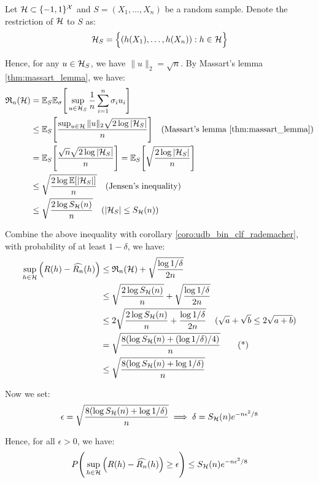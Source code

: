 \begin{proof*}
    Let $\mathcal{H}\subset\{-1,1\}^{\mathcal{X}}$ and $S=(X_1, \dots, X_n)$ be a random sample. Denote the restriction of $\mathcal{H}$ to $S$ as:
    \begin{align*}
        \mathcal{H}_S = \Big\{ 
            (h(X_1), \dots, h(X_n)) : h \in \mathcal{H}
         \Big\}
    \end{align*}

    \noindent Hence, for any $u\in\mathcal{H}_S$, we have $\|u\|_2 = \sqrt{n}$. By Massart's lemma \ref{thm:massart_lemma}, we have:
    \begin{align*}
        \RC_n(\Hf) &= \E_S\E_\sigma\biggSquare{
            \sup_{u\in \Hf_S} \frac{1}{n}\sum_{i=1}^n \sigma_i u_i
        } \\
        &\le \E_S\biggSquare{
            \frac{\sup_{u\in\Hf} \|u\|_2 \sqrt{2\log |\Hf_S|}}{n}
        } \ \ \ (\text{Massart's lemma \ref{thm:massart_lemma}}) \\
        &=  \E_S\biggSquare{
            \frac{\sqrt{n}\sqrt{2\log |\Hf_S|}}{n}
        } =  \E_S\biggSquare{
            \sqrt{\frac{2\log |\Hf_S|}{n}}
        } \\
        &\le \sqrt{\frac{2\log \E[|\Hf_S|]}{n}} \ \ \ (\text{Jensen's inequality}) \\
        &\le \sqrt{\frac{2\log S_\Hf(n)}{n}} \ \ \ (|\Hf_S| \le S_\Hf(n))
    \end{align*}

    \noindent Combine the above inequality with corollary \ref{coro:udb_bin_clf_rademacher}, with probability of at least $1-\delta$, we have:
    \begin{align*}
        \sup_{h\in\mathcal{H}} \Big( 
            R(h) - \widehat{R_n}(h)
         \Big) &\le \mathfrak{R}_n(\mathcal{H}) + \sqrt{
            \frac{\log 1/\delta}{2n}
        } \\
        &\le \sqrt{\frac{2\log S_{\mathcal{H}}(n)}{n}} + \sqrt{\frac{\log 1/\delta}{2n}} \\
        &\le 2\sqrt{
            \frac{2\log S_{\mathcal{H}}(n)}{n} + \frac{\log 1/\delta}{2n}
        } \ \ \ (\sqrt{a} + \sqrt{b} \le 2\sqrt{a+b}) \\
        &= \sqrt{
            \frac{8(\log S_{\mathcal{H}}(n) + (\log 1/\delta)/4)}{n}
        }  \tag{*} \\
        &\le \sqrt{
            \frac{8(\log S_{\mathcal{H}}(n) + \log 1/\delta)}{n}
        }
    \end{align*}

    \noindent Now we set:
    \begin{align*}
        \epsilon = \sqrt{
            \frac{8(\log S_{\mathcal{H}}(n) + \log 1/\delta)}{n}
        } \implies \delta = S_{\mathcal{H}}(n)e^{-n\epsilon^2/8}
    \end{align*}

    \noindent Hence, for all $\epsilon > 0$, we have:
    \begin{align*}
        P\Bigg( 
            \sup_{h\in\mathcal{H}} \Big( 
                R(h) - \widehat{R_n}(h)
             \Big) \ge \epsilon
         \Bigg) \le S_{\mathcal{H}}(n)e^{-n\epsilon^2/8}
    \end{align*}
\end{proof*}


